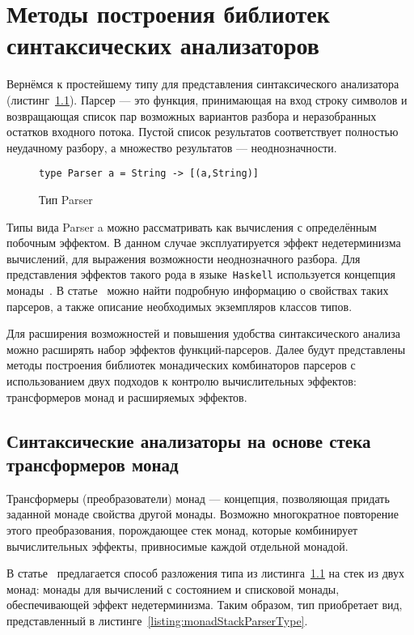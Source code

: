 \chapter{Методы построения библиотек синтаксических анализаторов}

Вернёмся к простейшему типу для представления синтаксического анализатора 
(листинг~\ref{listing:basicParserType}). Парсер --- это функция, 
принимающая на вход строку символов и возвращающая список пар возможных вариантов  
разбора и неразобранных остатков входного потока. Пустой список результатов 
соответствует полностью неудачному разбору, а множество результатов --- 
неоднозначности.

\begin{figure}[h]
\begin{lstlisting}
type Parser a = String -> [(a,String)]
\end{lstlisting}
\caption{Тип Parser}
\label{listing:basicParserType}
\end{figure}

Типы вида Parser a можно рассматривать как вычисления с
определённым побочным эффектом. В данном случае эксплуатируется эффект 
недетерминизма вычислений, для выражения возможности неоднозначного разбора.
Для представления эффектов такого рода в языке~\lstinline{Haskell} используется
концепция монады~\cite{wadlerMonads}. В статье~\cite{monParsing} можно найти 
подробную информацию о свойствах таких парсеров, а также описание необходимых 
экземпляров классов типов.

Для расширения возможностей и повышения удобства синтаксического анализа можно расширять
набор эффектов функций-парсеров. Далее будут представлены методы построения библиотек
монадических комбинаторов парсеров с использованием двух подходов к контролю
вычислительных эффектов: трансформеров монад и расширяемых эффектов. 

\section{Синтаксические анализаторы на основе стека трансформеров монад}

  Трансформеры (преобразователи) монад --- концепция, позволяющая придать заданной 
  монаде свойства другой монады. Возможно многократное повторение этого преобразования, 
  порождающее стек монад, которые комбинирует вычислительных эффекты, привносимые 
  каждой отдельной монадой.

  В статье~\cite{monParsing} предлагается способ разложения типа из 
  листинга~\ref{listing:basicParserType} на стек из двух монад: монады для вычислений 
  с состоянием и списковой монады, обеспечивающей эффект недетерминизма. Таким образом, 
  тип приобретает вид, представленный в листинге~\ref{listing:monadStackParserType}.


